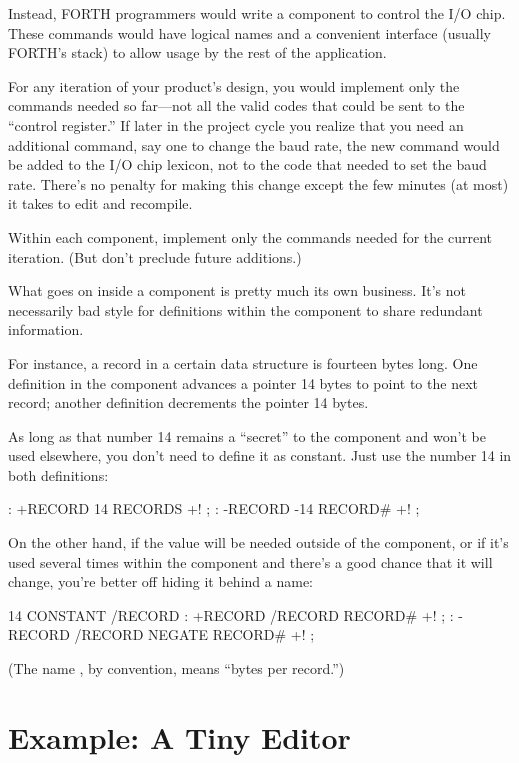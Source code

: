 Instead, FORTH programmers would write a component to control the I/O
chip. These commands would have logical names and a convenient
interface (usually FORTH's stack) to allow usage by the rest of the
application.

For any iteration of your product's design, you would implement only
the commands needed so far---not all the valid codes that could be
sent to the ``control register.'' If later in the project cycle you
realize that you need an additional command, say one to change the
baud rate, the new command would be added to the I/O chip lexicon, not
to the code that needed to set the baud rate. There's no penalty for
making this change except the few minutes (at most) it takes to edit
and recompile.

\begin{tip}
Within each component, implement only the commands needed for the
current iteration. (But don't preclude future additions.)
\end{tip}

What goes on inside a component is pretty much its own business. It's
not necessarily bad style for definitions within the component to share
redundant information.

For instance, a record in a certain data structure is fourteen bytes
long. One definition in the component advances a pointer 14 bytes to
point to the next record; another definition decrements the pointer 14
bytes.

As long as that number 14 remains a ``secret'' to the component and
won't be used elsewhere, you don't need to define it as constant. Just use
the number 14 in both definitions:

\begin{Code}
: +RECORD 14 RECORDS +! ;
: -RECORD -14 RECORD# +! ;
\end{Code}

On the other hand, if the value will be needed outside of the component,
or if it's used several times within the component and there's a good
chance that it will change, you're better off hiding it behind a name:

\begin{Code}
14 CONSTANT /RECORD
: +RECORD /RECORD RECORD# +! ;
: -RECORD /RECORD NEGATE RECORD# +! ;
\end{Code}

(The name , by convention, means ``bytes per record.'')

\section{Example: A Tiny Editor}

